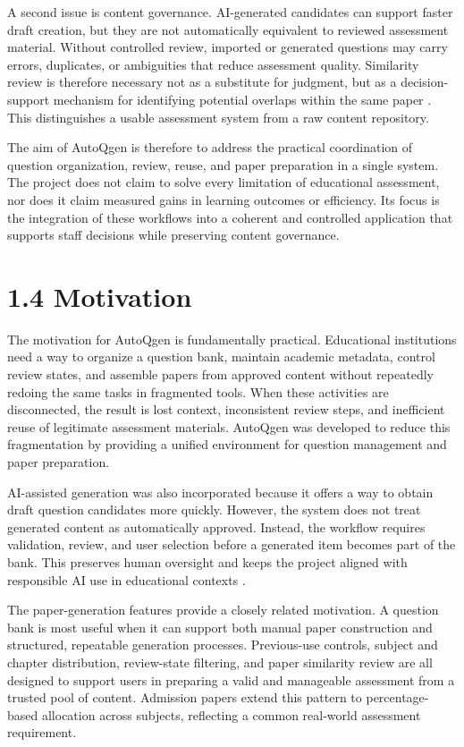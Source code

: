 A second issue is content governance. AI-generated candidates can support faster draft creation, but they are not automatically equivalent to reviewed assessment material. Without controlled review, imported or generated questions may carry errors, duplicates, or ambiguities that reduce assessment quality. Similarity review is therefore necessary not as a substitute for judgment, but as a decision-support mechanism for identifying potential overlaps within the same paper \cite{reimers2019sbert,agirre2012sts}. This distinguishes a usable assessment system from a raw content repository.

The aim of AutoQgen is therefore to address the practical coordination of question organization, review, reuse, and paper preparation in a single system. The project does not claim to solve every limitation of educational assessment, nor does it claim measured gains in learning outcomes or efficiency. Its focus is the integration of these workflows into a coherent and controlled application that supports staff decisions while preserving content governance.

\section{1.4 Motivation}

The motivation for AutoQgen is fundamentally practical. Educational institutions need a way to organize a question bank, maintain academic metadata, control review states, and assemble papers from approved content without repeatedly redoing the same tasks in fragmented tools. When these activities are disconnected, the result is lost context, inconsistent review steps, and inefficient reuse of legitimate assessment materials. AutoQgen was developed to reduce this fragmentation by providing a unified environment for question management and paper preparation.

AI-assisted generation was also incorporated because it offers a way to obtain draft question candidates more quickly. However, the system does not treat generated content as automatically approved. Instead, the workflow requires validation, review, and user selection before a generated item becomes part of the bank. This preserves human oversight and keeps the project aligned with responsible AI use in educational contexts \cite{amershi2019}.

The paper-generation features provide a closely related motivation. A question bank is most useful when it can support both manual paper construction and structured, repeatable generation processes. Previous-use controls, subject and chapter distribution, review-state filtering, and paper similarity review are all designed to support users in preparing a valid and manageable assessment from a trusted pool of content. Admission papers extend this pattern to percentage-based allocation across subjects, reflecting a common real-world assessment requirement.

